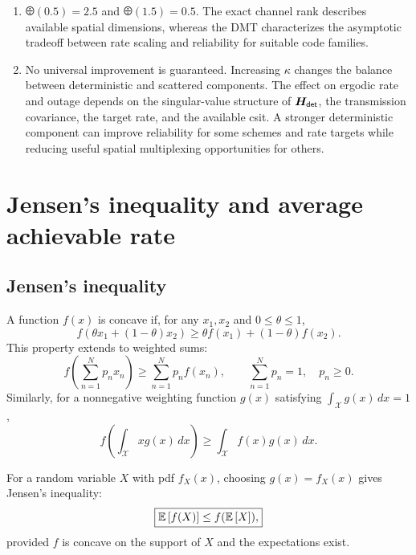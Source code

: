 \begin{enumerate}[label=\textbf{E\arabic*.}]
	\item $\odiv(0.5)=2.5$ and $\odiv(1.5)=0.5$. The exact channel rank describes available spatial dimensions, whereas the DMT characterizes the asymptotic tradeoff between rate scaling and reliability for suitable code families.
	
	\item No universal improvement is guaranteed. Increasing $\kappa$ changes the balance between deterministic and scattered components. The effect on ergodic rate and outage depends on the singular-value structure of $\bm{H}_{\mathsf{det}}$, the transmission covariance, the target rate, and the available \ac{csit}. A stronger deterministic component can improve reliability for some schemes and rate targets while reducing useful spatial multiplexing opportunities for others.
\end{enumerate}

\clearpage
\appendix

\section{Jensen's inequality and average achievable rate}
\label{app:jensen}


\subsection{Jensen's inequality}

A function $f(x)$ is concave if, for any $x_1,x_2$ and $0\leq\theta\leq1$,
\begin{equation*}
	f(\theta x_1+(1-\theta)x_2)
	\geq\theta f(x_1)+(1-\theta)f(x_2).
\end{equation*}
This property extends to weighted sums:
\begin{equation*}
	f\left(\sum_{n=1}^{N}p_nx_n\right)
	\geq\sum_{n=1}^{N}p_nf(x_n),
	\qquad
	\sum_{n=1}^{N}p_n=1,\quad p_n\geq0.
\end{equation*}
Similarly, for a nonnegative weighting function $g(x)$ satisfying $\int_{\mathcal X}g(x)\,dx=1$,
\begin{equation*}
	f\left(\int_{\mathcal X}xg(x)\,dx\right)
	\geq\int_{\mathcal X}f(x)g(x)\,dx.
\end{equation*}

For a random variable $X$ with \ac{pdf} $f_X(x)$, choosing $g(x)=f_X(x)$ gives Jensen's inequality:
\begin{equation}\label{eq:app-jensen}
	\boxed{
		\mathbb{E}\left[f(X)\right]\leq f(\mathbb{E}\left[X\right]),
	}
\end{equation}
provided $f$ is concave on the support of $X$ and the expectations exist.

